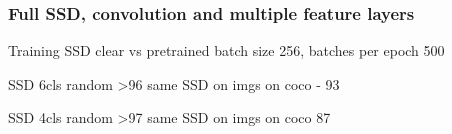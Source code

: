 \subsubsection{Full SSD, convolution and multiple feature layers}
Training SSD clear vs pretrained
batch size 256, batches per epoch 500

SSD 6cls random >96
same SSD on imgs on coco - 93

SSD 4cls random >97
same SSD on imgs on coco 87


